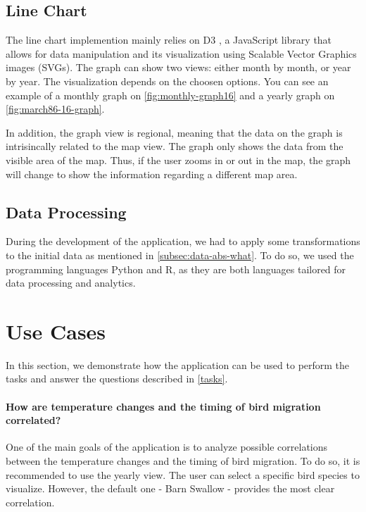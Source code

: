\documentclass[journal]{vgtc}                %
\begin{document}
\subsection{Line Chart}

The line chart implemention mainly relies on D3 \cite{d3js}, a JavaScript library that allows for data manipulation and its visualization using Scalable Vector Graphics images (SVGs). The graph can show two views: either month by month, or year by year. The visualization depends on the choosen options. You can see an example of a monthly graph on \autoref{fig:monthly-graph16} and a yearly graph on \autoref{fig:march86-16-graph}.

In addition, the graph view is regional, meaning that the data on the graph is intrisincally related to the map view. The graph only shows the data from the visible area of the map. Thus, if the user zooms in or out in the map, the graph will change to show the information regarding a different map area.

\subsection{Data Processing}

During the development of the application, we had to apply some transformations to the initial data as mentioned in \autoref{subsec:data-abs-what}. To do so, we used the programming languages Python and R, as they are both languages tailored for data processing and analytics.


\section{Use Cases}

In this section, we demonstrate how the application can be used to perform the tasks and answer the questions described in \autoref{tasks}.

\paragraph{How are temperature changes and the timing of bird migration correlated?}

One of the main goals of the application is to analyze possible correlations between the temperature changes and the timing of bird migration. To do so, it is recommended to use the yearly view. The user can select a specific bird species to visualize. However, the default one - Barn Swallow - provides the most clear correlation.
\end{document}
